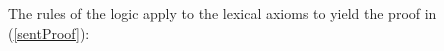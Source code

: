\documentclass[output=paper,colorlinks,citecolor=brown]{langscibook}
\begin{document}
The rules of the logic apply to the lexical axioms to yield the proof
in (\ref{sentProof}):
%
\end{document}
